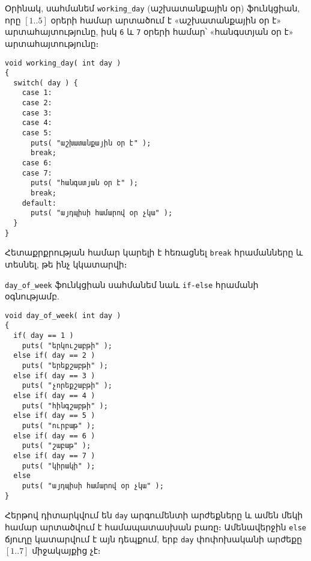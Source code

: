 Օրինակ, սահմանեմ \texttt{working\_day} (աշխատանքային օր) ֆունկցիան, որը
\([1..5]\) օրերի համար արտածում է «աշխատանքային օր է» արտահայտությունը, իսկ
\texttt{6} և \texttt{7} օրերի համար՝ «հանգստյան օր է» արտահայտությունը։

\begin{verbatim}
void working_day( int day )
{
  switch( day ) {
    case 1:
    case 2:
    case 3:
    case 4:
    case 5:
      puts( "աշխատանքային օր է" );
      break;
    case 6:
    case 7:
      puts( "հանգստյան օր է" );
      break;
    default:
      puts( "այդպիսի համարով օր չկա" );
  }
}
\end{verbatim}

Հետաքրքրության համար կարելի է հեռացնել \texttt{break} հրամանները և տեսնել,
թե ինչ կկատարվի։


\texttt{day\_of\_week} ֆունկցիան սահմանեմ նաև \texttt{if-else} հրամանի օգնությամբ.

\begin{verbatim}
void day_of_week( int day )
{
  if( day == 1 )
    puts( "երկուշաբթի" );
  else if( day == 2 )
    puts( "երեքշաբթի" );
  else if( day == 3 )
    puts( "չորեքշաբթի" );
  else if( day == 4 )
    puts( "հինգշաբթի" );
  else if( day == 5 )
    puts( "ուրբաթ" );
  else if( day == 6 )
    puts( "շաբաթ" );
  else if( day == 7 )
    puts( "կիրակի" );
  else
    puts( "այդպիսի համարով օր չկա" );
}
\end{verbatim}

Հերթով դիտարկվում են \texttt{day} արգումենտի արժեքները և ամեն մեկի համար
արտածվում է համապատասխան բառը։ Ամենավերջին \texttt{else} ճյուղը կատարվում
է այն դեպքում, երբ \texttt{day} փոփոխականի արժեքը \([1..7]\) միջակայքից չէ։
